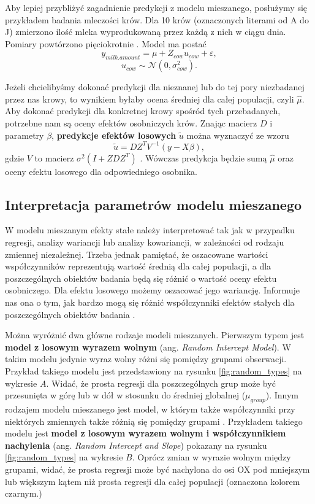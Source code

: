 \documentclass[12pt]{mwbk}
\theoremstyle{plain}
\theoremstyle{definition}
\theoremstyle{definition}
\begin{document}
 Aby lepiej przybliżyć zagadnienie predykcji z modelu mieszanego, posłużymy się przykładem badania mleczości krów. Dla 10 krów (oznaczonych literami od A do J) zmierzono ilość mleka wyprodukowaną przez każdą z nich w ciągu dnia. Pomiary powtórzono pięciokrotnie \cite{biecek}.
Model ma postać 
$$y_{milk.amount}=\mu+Z_{cow}u_{cow}+\varepsilon,$$
$$u_{cow} \sim \mathcal{N}(0, \sigma^2_{cow}).$$

Jeżeli chcielibyśmy dokonać predykcji dla nieznanej lub do tej pory niezbadanej przez nas krowy, to wynikiem byłaby ocena średniej dla całej populacji, czyli $\hat{\mu}$.
Aby dokonać predykcji dla konkretnej krowy spośród tych przebadanych, potrzebne nam są oceny efektów osobniczych krów.
Znając macierz $D$ i parametry $\beta$, \textbf{predykcje efektów losowych} $\widetilde{u}$ można wyznaczyć ze wzoru
$$\widetilde{u}=DZ^TV^{-1}(y-X\beta),$$
gdzie $V$ to macierz $\sigma^2(I+ZDZ^T)$ \cite{biecek}. Wówczas predykcja będzie sumą $\hat{\mu}$ oraz oceny efektu losowego dla odpowiedniego osobnika.

 
 
 
 
 \subsection{Interpretacja parametrów modelu mieszanego}
 W modelu mieszanym efekty stałe należy interpretować tak jak w przypadku regresji, analizy wariancji lub analizy kowariancji, w zależności od rodzaju zmiennej niezależnej. Trzeba jednak pamiętać, że oszacowane wartości współczynników reprezentują wartość średnią dla całej populacji, a dla poszczególnych obiektów badania będą się różnić o wartość oceny efektu osobniczego.
 Dla efektu losowego możemy oszacować jego wariancję. Informuje nas ona o tym, jak bardzo mogą się różnić współczynniki efektów stałych dla poszczególnych obiektów badania
 \cite{experimental}.
 
 Można wyróżnić dwa główne rodzaje modeli mieszanych. Pierwszym typem jest \textbf{model z losowym wyrazem wolnym} (ang. \textit{Random Intercept Model}). W takim modelu jedynie wyraz wolny różni się pomiędzy grupami obserwacji\cite{insurance}. Przykład takiego modelu jest przedstawiony na rysunku \ref{fig:random_types} na wykresie $A$. Widać, że prosta regresji dla poszczególnych grup może być przesunięta w górę lub w dół w stosunku do średniej globalnej ($\mu_{group}$). 
 Innym rodzajem modelu mieszanego jest model, w którym także współczynniki przy niektórych zmiennych także różnią się pomiędzy grupami \cite{insurance}. Przykładem takiego modelu jest \textbf{model z losowym wyrazem wolnym i współczynnikiem nachylenia} (ang. \textit{Random Intercept and Slope}) pokazany na rysunku \ref{fig:random_types} na wykresie $B$. Oprócz zmian w wyrazie wolnym między grupami, widać, że prosta regresji może być nachylona do osi OX pod mniejszym lub większym kątem niż prosta regresji dla całej populacji (oznaczona kolorem czarnym.)
 
\end{document}
